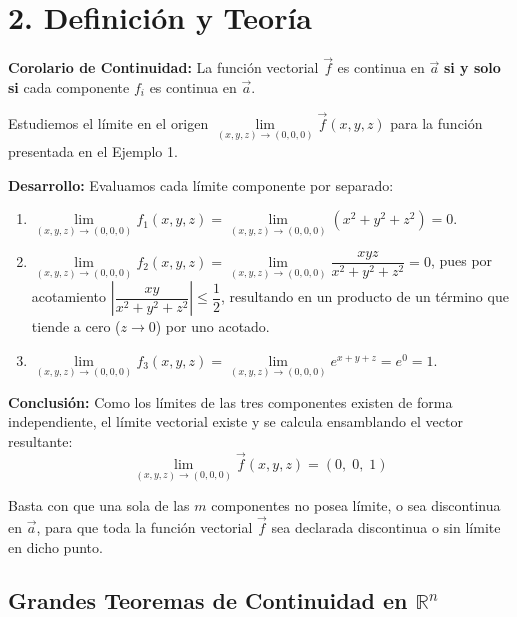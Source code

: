 \documentclass[11pt]{article}
\newenvironment{teoria}{%
  \section*{2. Definición y Teoría}%
}{}
\newenvironment{teorema}[1]{%
  \begin{tcolorbox}[colback=green!5,colframe=green!75!black,title=Teorema: #1]%
}{%
  \end{tcolorbox}%
}
\newenvironment{alerta}[1]{%
  \begin{tcolorbox}[colback=yellow!10,colframe=orange!80!black,title=Alerta: #1]%
}{%
  \end{tcolorbox}%
}
\newenvironment{ejemplo}[1]{%
  \begin{tcolorbox}[colback=white,colframe=gray!40,title=Ejemplo: #1]%
}{%
  \end{tcolorbox}%
}
\begin{document}
\begin{teoria}
\begin{teorema}{Límite y Continuidad por Componentes en $\mathbb{R}^n$}
    \textbf{Corolario de Continuidad:}
    La función vectorial $\vec{f}$ es continua en $\vec{a}$ \textbf{si y solo si} cada componente $f_i$ es continua en $\vec{a}$. 
  \end{teorema}

  \begin{ejemplo}{Evaluación del Límite de un Campo Vectorial en el Origen}
    Estudiemos el límite en el origen $\displaystyle \lim\limits_{(x,y,z) \to (0,0,0)} \vec{f}(x,y,z)$ para la función presentada en el Ejemplo 1.
    
    \textbf{Desarrollo:}
    Evaluamos cada límite componente por separado:
    \begin{enumerate}
      \item $\displaystyle \lim\limits_{(x,y,z) \to (0,0,0)} f_1(x,y,z) = \displaystyle \lim\limits_{(x,y,z) \to (0,0,0)} (x^2 + y^2 + z^2) = 0$.
      \item $\displaystyle \lim\limits_{(x,y,z) \to (0,0,0)} f_2(x,y,z) = \displaystyle \lim\limits_{(x,y,z) \to (0,0,0)} \displaystyle \dfrac{xyz}{x^2 + y^2 + z^2} = 0$, pues por acotamiento $\left| \displaystyle \dfrac{xy}{x^2+y^2+z^2} \right| \leq \displaystyle \dfrac{1}{2}$, resultando en un producto de un término que tiende a cero ($z \to 0$) por uno acotado.
      \item $\displaystyle \lim\limits_{(x,y,z) \to (0,0,0)} f_3(x,y,z) = \displaystyle \lim\limits_{(x,y,z) \to (0,0,0)} e^{x+y+z} = e^0 = 1$.
    \end{enumerate}
    
    \textbf{Conclusión:}
    Como los límites de las tres componentes existen de forma independiente, el límite vectorial existe y se calcula ensamblando el vector resultante:
    $$ \displaystyle \lim\limits_{(x,y,z) \to (0,0,0)} \vec{f}(x,y,z) = (0, \; 0, \; 1) $$
  \end{ejemplo}

  \begin{alerta}{El Principio del Eslabón Más Débil}
    Basta con que una sola de las $m$ componentes no posea límite, o sea discontinua en $\vec{a}$, para que toda la función vectorial $\vec{f}$ sea declarada discontinua o sin límite en dicho punto.
  \end{alerta}

  \subsection*{Grandes Teoremas de Continuidad en $\mathbb{R}^n$}
  

\end{teoria}
\end{document}

